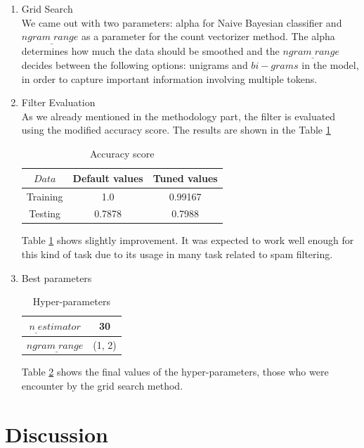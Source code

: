 \documentclass[journal]{IEEEtran}
\begin{document}
\begin{enumerate}
\begin{enumerate}
\item Grid Search\\
We came out with two parameters: alpha for Naive Bayesian classifier and $ngram_{\_}range$ as a parameter for the count vectorizer method.
The alpha determines how much the data should be smoothed and the $ngram_{\_}range$ decides between the following options: unigrams and $bi-grams$ in the model, in order to capture important information involving multiple tokens.
 
\item Filter Evaluation\\
As we already mentioned in the methodology part, the filter is evaluated using the modified accuracy score. The results are shown in the Table \ref{temp0}

\begin{table}[ht]
\renewcommand{\arraystretch}{1.3}
\centering
\begin{tabular}{|c|c|c|}
\hline
$ Data$ & Default values & Tuned values\\
\hline
Training & 1.0 & 0.99167\\
\hline
Testing & 0.7878 & 0.7988\\
\hline
\end{tabular}
\caption{Accuracy score}
\label{temp0}
\end{table}
Table \ref{temp0} shows slightly improvement. It was expected to work well enough for this kind of task due to its usage in many task related to spam filtering. 

\item Best parameters

\begin{table}[ht]
\renewcommand{\arraystretch}{1.3}
\centering
\begin{tabular}{|c|c|}
\hline
$n_{\_}estimator$ & 30\\
\hline
$ngram_{\_}range$ & (1, 2) \\
\hline
\end{tabular}
\caption{Hyper-parameters}
\label{temp5}
\end{table}
Table \ref{temp5} shows the final values of the hyper-parameters, those who were encounter by the grid search method.
\end{enumerate}
\end{enumerate}


\section{Discussion}
\end{document}
